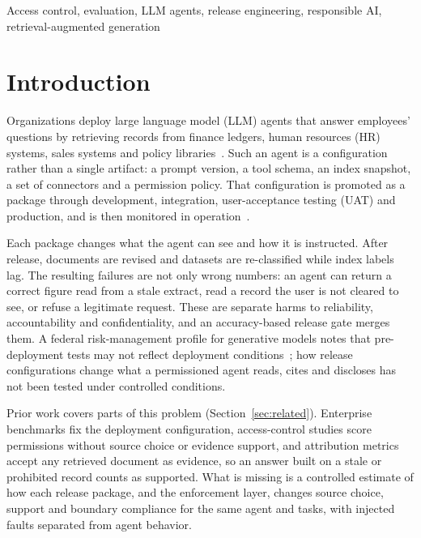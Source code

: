 \documentclass[conference,a4paper]{IEEEtran}
\begin{document}
\begin{IEEEkeywords}
Access control, evaluation, LLM agents, release engineering, responsible AI, retrieval-augmented generation
\end{IEEEkeywords}

\section{Introduction}
Organizations deploy large language model (LLM) agents that answer employees' questions by retrieving records from finance ledgers, human resources (HR) systems, sales systems and policy libraries~\cite{vishwakarma2025enterprisebench,huang2026crmarenapro}. Such an agent is a configuration rather than a single artifact: a prompt version, a tool schema, an index snapshot, a set of connectors and a permission policy. That configuration is promoted as a package through development, integration, user-acceptance testing (UAT) and production, and is then monitored in operation~\cite{breck2017mltestscore,xia2024eddops}.

Each package changes what the agent can see and how it is instructed. After release, documents are revised and datasets are re-classified while index labels lag. The resulting failures are not only wrong numbers: an agent can return a correct figure read from a stale extract, read a record the user is not cleared to see, or refuse a legitimate request. These are separate harms to reliability, accountability and confidentiality, and an accuracy-based release gate merges them. A federal risk-management profile for generative models notes that pre-deployment tests may not reflect deployment conditions~\cite{nist2024genai600}; how release configurations change what a permissioned agent reads, cites and discloses has not been tested under controlled conditions.

Prior work covers parts of this problem (Section~\ref{sec:related}). Enterprise benchmarks fix the deployment configuration, access-control studies score permissions without source choice or evidence support, and attribution metrics accept any retrieved document as evidence, so an answer built on a stale or prohibited record counts as supported. What is missing is a controlled estimate of how each release package, and the enforcement layer, changes source choice, support and boundary compliance for the same agent and tasks, with injected faults separated from agent behavior.
\end{document}

